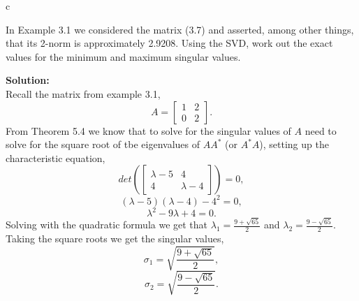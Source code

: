 \documentclass[12pt]{article}
\makeatletter
\theoremstyle{homework}
\newenvironment{exercise}[1]
{\def\@currentlabel{#1}\exercisecore}
{\endexercisecore}
\newcommand{\localhead}[1]{\par\smallskip\noindent\textbf{#1}\nobreak\\}%
\newcommand\solution{\localhead{Solution:}}
\makeatother
\begin{document}
\vspace{1in} c

\begin{exercise}{5.1} In Example 3.1 we considered the matrix (3.7) and asserted, among other things, 
  that its 2-norm is approximately 2.9208. Using the SVD, work out the exact values for the minimum 
  and maximum singular values.\\
  \solution Recall the matrix from example 3.1,
  \begin{equation*}
    A = 
    \begin{bmatrix}
      1 & 2\\ 
      0 & 2
    \end{bmatrix}.
  \end{equation*}
  From Theorem 5.4 we know that to solve for the singular values of $A$ need to solve for the square root of tbe eigenvalues of 
  $AA^*$ (or $A^*A$), setting up the characteristic equation, 
  \begin{equation*}
    det\left(
      \begin{bmatrix}
        \lambda - 5 & 4\\ 
        4 & \lambda - 4
      \end{bmatrix}
    \right) = 0,
  \end{equation*}
  \begin{equation*}
        (\lambda - 5)(\lambda - 4) - 4^2 = 0,
  \end{equation*}
  \begin{equation*}
    \lambda^2 - 9\lambda + 4  = 0.
\end{equation*}
Solving with the quadratic formula we get that $\lambda_1=\frac{9+\sqrt{65}}{2}$ and $\lambda_2=\frac{9-\sqrt{65}}{2}$.
Taking the square roots we get the singular values, 
\begin{equation*}
  \sigma_1 = \sqrt{\frac{9+\sqrt{65}}{2}},
\end{equation*}
\begin{equation*}
  \sigma_2 = \sqrt{\frac{9-\sqrt{65}}{2}}.
\end{equation*}  
\end{exercise}
\vspace{1in}
\end{document}
